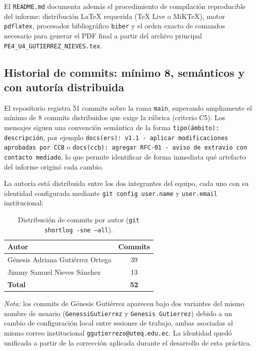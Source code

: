 \documentclass[journal,onecolumn]{IEEEtran}
\begin{document}
	El \texttt{README.md} documenta además el procedimiento de compilación reproducible
	del informe: distribución \LaTeX{} requerida (TeX Live o MiKTeX), motor
	\texttt{pdflatex}, procesador bibliográfico \texttt{biber} y el orden exacto de
	comandos necesario para generar el PDF final a partir del archivo principal
	\texttt{PE4\_U4\_GUTIERREZ\_NIEVES.tex}.
	
	\subsection{Historial de commits: mínimo 8, semánticos y con autoría distribuida}
	\label{subsec:8.2}
	
	El repositorio registra 51 commits sobre la rama \texttt{main}, superando
	ampliamente el mínimo de 8 commits distribuidos que exige la rúbrica (criterio C5).
	Los mensajes siguen una convención semántica de la forma \texttt{tipo(ámbito):
		descripción}, por ejemplo \texttt{docs(ers): v1.1 - aplicar modificaciones aprobadas
		por CCB} o \texttt{docs(ccb): agregar RFC-01 - aviso de extravío con contacto
		mediado}, lo que permite identificar de forma inmediata qué artefacto del informe
	originó cada cambio.
	
	La autoría está distribuida entre los dos integrantes del equipo, cada uno con su
	identidad configurada mediante \texttt{git config user.name} y \texttt{user.email}
	institucional:
	
	\begin{table}[H]
		\centering
		\caption{Distribución de commits por autor (\texttt{git shortlog -sne --all}).}
		\label{tab:autoria-commits}
		\begin{tabular}{lc}
			\toprule
			\textbf{Autor} & \textbf{Commits} \\
			\midrule
			Génesis Adriana Gutiérrez Ortega & 39 \\
			Jimmy Samuel Nieves Sánchez & 13 \\
			\midrule
			\textbf{Total} & \textbf{52} \\
			\bottomrule
		\end{tabular}
	\end{table}
	
	\noindent\textit{Nota:} los commits de Génesis Gutiérrez aparecen bajo dos variantes
	del mismo nombre de usuario (\texttt{GenessiGutierrez} y \texttt{Genesis Gutierrez})
	debido a un cambio de configuración local entre sesiones de trabajo, ambas asociadas
	al mismo correo institucional \texttt{ggutierrezo@uteq.edu.ec}. La identidad quedó
	unificada a partir de la corrección aplicada durante el desarrollo de esta práctica.
	
\end{document}
